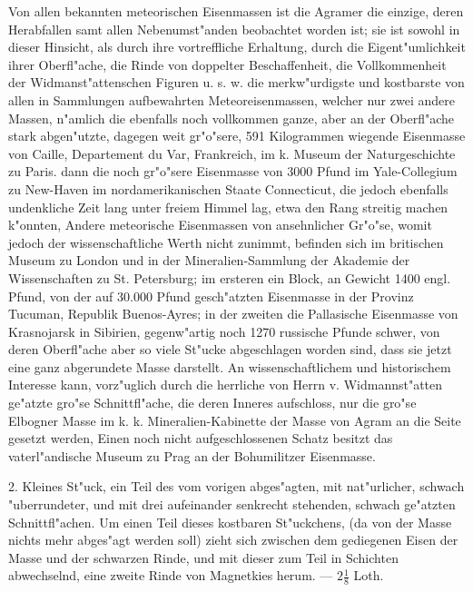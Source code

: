 \documentclass[a4paper, 11pt, oneside, polutonikogreek, german]{article}
\begin{document}
{\footnotesize Von allen bekannten meteorischen Eisenmassen ist die Agramer die einzige, deren Herabfallen samt allen Nebenumst"anden beobachtet worden ist; sie ist sowohl in dieser Hinsicht, als durch ihre vortreffliche Erhaltung, durch die Eigent"umlichkeit ihrer Oberfl"ache, die Rinde von doppelter Beschaffenheit, die Vollkommenheit der Widmanst"attenschen Figuren u. s. w. die merkw"urdigste und kostbarste von allen in Sammlungen aufbewahrten Meteoreisenmassen, welcher nur zwei andere Massen, n"amlich die ebenfalls noch vollkommen ganze, aber an der Oberfl"ache stark abgen"utzte, dagegen weit gr"o"sere, 591 Kilogrammen wiegende Eisenmasse von Caille, Departement du Var, Frankreich, im k. Museum der Naturgeschichte zu Paris. dann die noch gr"o"sere Eisenmasse von 3000 Pfund im Yale-Collegium zu New-Haven im nordamerikanischen Staate Connecticut, die jedoch ebenfalls undenkliche Zeit lang unter freiem Himmel lag, etwa den Rang streitig machen k"onnten, Andere meteorische Eisenmassen von ansehnlicher Gr"o"se, womit jedoch der wissenschaftliche Werth nicht zunimmt, befinden sich im britischen Museum zu London und in der Mineralien-Sammlung der Akademie der Wissenschaften zu St. Petersburg; im ersteren ein Block, an Gewicht 1400 engl. Pfund, von der auf 30.000 Pfund gesch"atzten Eisenmasse in der Provinz Tucuman, Republik Buenos-Ayres; in der zweiten die Pallasische Eisenmasse von Krasnojarsk in Sibirien, gegenw"artig noch 1270 russische Pfunde schwer, von deren Oberfl"ache aber so viele St"ucke abgeschlagen worden sind, dass sie jetzt eine ganz abgerundete Masse darstellt. An wissenschaftlichem und historischem Interesse kann, vorz"uglich durch die herrliche von Herrn v. Widmannst"atten ge"atzte gro"se Schnittfl"ache, die deren Inneres aufschloss, nur die gro"se Elbogner Masse im k. k. Mineralien-Kabinette der Masse von Agram an die Seite gesetzt werden, Einen noch nicht aufgeschlossenen Schatz besitzt das vaterl"andische Museum zu Prag an der Bohumilitzer Eisenmasse.}

\setlength{\leftskip}{0pt}
\setlength{\parindent}{20pt}

2. Kleines St"uck, ein Teil des vom vorigen abges"agten, mit nat"urlicher, schwach "uberrundeter, und mit drei aufeinander senkrecht stehenden, schwach ge"atzten Schnittfl"achen. Um einen Teil dieses kostbaren St"uckchens, (da von der Masse nichts mehr abges"agt werden soll) zieht sich zwischen dem gediegenen Eisen der Masse und der schwarzen Rinde, und mit dieser zum Teil in Schichten abwechselnd, eine zweite Rinde von Magnetkies herum. --- $2\frac{1}{8}$ Loth.
\end{document}
